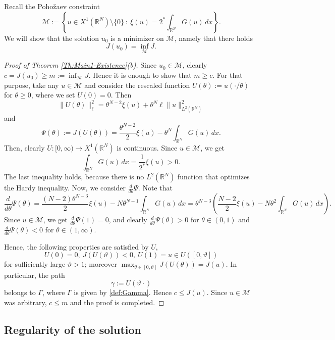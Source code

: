 \documentclass[12pt,leqno,twoside,sort]{amsart}
\newcommand{\R}{\mathbb{R}}
\newcommand{\cM}{{\mathcal M}}
\numberwithin{equation}{section}
\begin{document}
Recall the Poho\v{z}aev constraint
$$
\cM := \left\{ u \in X^1 (\R^N) \setminus \{0\} \ : \ \xi(u) = 2^* \int_{\R^N} G(u) \, dx \right\}.
$$
We will show that the solution $u_0$ is a minimizer on $\cM$, namely that there holds
$$
J(u_0) = \inf_{\cM} J.
$$

\begin{proof}[Proof of Theorem \ref{Th:Main1-Existence}(b)]
Since $u_0 \in \cM$, clearly $c = J(u_0) \geq m := \inf_{\cM} J$. Hence it is enough to show that $m \geq c$. For that purpose, take any $u \in \cM$ and consider the rescaled function $U(\theta) := u(\cdot / \theta)$ for $\theta \geq 0$, where we set $U(0) = 0$. Then
$$
\| U(\theta) \|_\ell^2 = \theta^{N-2} \xi(u) + \theta^N \ell \|u\|_{L^2(\R^N)}^2
$$
and
$$
\Psi(\theta) := J(U(\theta)) = \frac{\theta^{N-2}}{2} \xi(u) - \theta^N \int_{\R^N} G(u) \, dx.
$$
Then, clearly $U : [0,\infty) \rightarrow X^1 (\R^N)$ is continuous. Since $u \in \cM$, we get
$$
\int_{\R^N} G(u) \, dx = \frac{1}{2^*} \xi(u) > 0.
$$
The last inequality holds, because there is no $L^2(\R^N)$ function that optimizes the Hardy inequality. Now, we consider $\frac{d}{d \theta} \Psi$. Note that
$$
\frac{d}{d \theta} \Psi(\theta) = \frac{(N-2) \theta^{N-3}}{2 } \xi(u) - N \theta^{N-1} \int_{\R^N} G(u) \, dx = \theta^{N-3} \left( \frac{N-2}{2 } \xi(u) - N \theta^{2} \int_{\R^N} G(u) \, dx \right).
$$
Since $u \in \cM$, we get $\frac{d}{d \theta} \Psi(1) = 0$, and clearly $\frac{d}{d \theta} \Psi(\theta) > 0$ for $\theta \in (0,1)$ and $\frac{d}{d \theta} \Psi(\theta) < 0$ for $\theta \in (1,\infty)$.

Hence, the following properties are satisfied by $U$,
$$
U(0) = 0, \ J(U(\vartheta)) < 0, \ U(1) = u \in U([0,\vartheta])
$$
for sufficiently large $\vartheta > 1$; moreover $\max_{\theta \in [0,\vartheta]} J(U(\theta)) = J(u)$. In particular, the path 
\begin{equation}\label{eq:path}
\gamma := U(\vartheta \cdot)
\end{equation}
belongs to $\Gamma$, where $\Gamma$ is given by \eqref{def:Gamma}. Hence $c \leq J(u)$. Since $u \in \cM$ was arbitrary, $c \leq m$ and the proof is completed.
\end{proof}

\subsection{Regularity of the solution}
\end{document}
